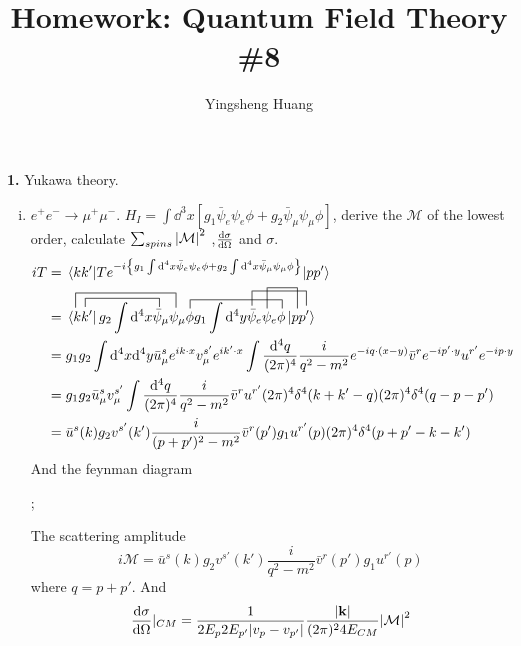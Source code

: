 \documentclass{article}
\title{Homework: Quantum Field Theory \#8}
\author{Yingsheng Huang}
\newcommand{\s}{\sigma}
\begin{document}
\maketitle
{\bf1.}\quad
Yukawa theory.

\begin{enumerate}[(i)]
  \item $e^+e^-\rightarrow\mu^+\mu^-$. $H_I=\int\dd^3x[g_1\bar\psi_e\psi_e\phi+g_2\bar\psi_{\mu}\psi_{\mu}\phi]$, derive the $\mathcal{M}$ of the lowest order, calculate $\sum_{spins}\abs{\mathcal{M}}^2$ ,$\dv{\s}{\Omega}$ and $\s$.
  \begin{align*}
    iT&=\mel{kk'}{Te^{-i\Bqty{g_1\int\dd^4x\bar\psi_e\psi_e\phi+g_2\int\dd^4x\bar\psi_{\mu}\psi_{\mu}\phi}}}{pp'}\\
    &=\contraction[2.5ex]{}{\bra{k}}{k' g_2\int\dd^4x\bar\psi_{\mu}}{\psi_{\mu}}\contraction[1.5ex]{k}{\bra{k'}}{g_1\int\dd^4x}{\psi_{\mu}}\contraction[1.5ex]{\bra{kk'} g_2\int\dd^4x\bar\psi_{\mu}\psi_{\mu}}{\phi}{g_2\int\dd^4y\bar\psi_{e}\psi_{e}}{\phi}\contraction[2.5ex]{\bra{kk'} g_1\int\dd^4x\bar\psi_{\mu}\psi_{\mu}\phi  g_2\int\dd^4y}{\bar\psi}{_{e}\psi_{e}\phi p}{\ket{p'}}\contraction[3.5ex]{\bra{kk'} g_1\int\dd^4x\bar\psi_{\mu}\psi_{\mu}\phi  g_2\int\dd^4y\bar\psi_{e}}{\psi}{_{e}\phi}{\ket{p}}\bra{kk'} g_2\int\dd^4x\bar\psi_{\mu}\psi_{\mu}\phi  g_1\int\dd^4y\bar\psi_{e}\psi_{e}\phi \ket{pp'}\\
    &=g_1g_2\int\dd^4x\dd^4y\bar u_{\mu}^se^{ik\cdot x}v^{s'}_{\mu}e^{ik'\cdot x}\int\frac{\dd^4q}{(2\pi)^4}\frac{i}{q^2-m^2}e^{-iq\cdot(x-y)}\bar v^re^{-ip'\cdot y}u^{r'}e^{-ip\cdot y}\\
    &=g_1g_2\bar u_{\mu}^sv^{s'}_{\mu}\int\frac{\dd^4q}{(2\pi)^4}\frac{i}{q^2-m^2}\bar v^ru^{r'}(2\pi)^4\delta^4(k+k'-q)(2\pi)^4\delta^4(q-p-p')\\
    &=\bar u^s(k)g_2v^{s'}(k')\frac{i}{(p+p')^2-m^2}\bar v^r(p')g_1u^{r'}(p)(2\pi)^4\delta^4(p+p'-k-k')
  \end{align*}
  And the feynman diagram
  \begin{center}
    ;
  \end{center}
  The scattering amplitude
  $$i\mathcal{M}=\bar u^s(k)g_2v^{s'}(k')\frac{i}{q^2-m^2}\bar v^r(p')g_1u^{r'}(p)$$
  where $q=p+p'$.
  And
  $$\dv{\s}{\Omega}|_{CM}=\frac{1}{2E_p2E_{p'}\abs{v_p-v_{p'}}}\frac{\abs{\vb{k}}}{(2\pi)^24E_{CM}}\abs{\mathcal{M}}^2$$

\end{enumerate}
\end{document}

